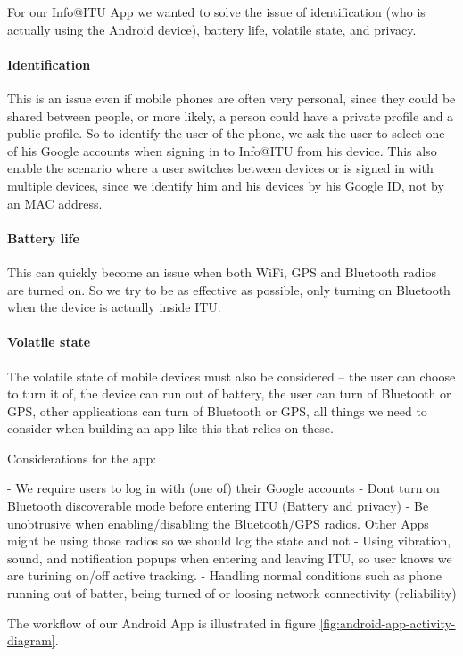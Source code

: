 \documentclass{ubicomp2011}
\begin{document}
For our Info@ITU App we wanted to solve the issue of identification (who is actually using the Android device), battery life, volatile state, and privacy.

\paragraph{Identification}
This is an issue even if mobile phones are often very personal, since they could be shared between people, or more likely, a person could have a private profile and a public profile. So to identify the user of the phone, we ask the user to select one of his Google accounts when signing in to Info@ITU from his device. This also enable the scenario where a user switches between devices or is signed in with multiple devices, since we identify him and his devices by his Google ID, not by an MAC address.

\paragraph{Battery life}
This can quickly become an issue when both WiFi, GPS and Bluetooth radios are turned on. So we try to be as effective as possible, only turning on Bluetooth when the device is actually inside ITU.

\paragraph{Volatile state}
The volatile state of mobile devices must also be considered -- the user can choose to turn it of, the device can run out of battery, the user can turn of Bluetooth or GPS, other applications can turn of Bluetooth or GPS, all things we need to consider when building an app like this that relies on these.



Considerations for the app:

- We require users to log in with (one of) their Google accounts
- Dont turn on Bluetooth discoverable mode before entering ITU (Battery and privacy)
- Be unobtrusive when enabling/disabling the Bluetooth/GPS radios. Other Apps might be using those radios so we should log the state and not
- Using vibration, sound, and notification popups when entering and leaving ITU, so user knows we are turining on/off active tracking.
- Handling normal conditions such as phone running out of batter, being turned of or loosing network connectivity (reliability)


The workflow of our Android App is illustrated in figure \ref{fig:android-app-activity-diagram}.




\end{document}
